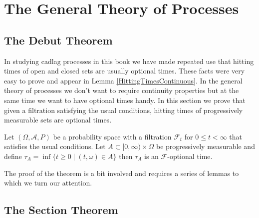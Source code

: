 \chapter{The General Theory of Processes}

\section{The Debut Theorem}

In studying cadlag processes in this book we have made repeated use that hitting times of open and closed sets are usually optional times.  These facts were very easy to prove
and appear in Lemma \ref{HittingTimesContinuous}.   In the general theory of processes we don't want to require continuity properties but at the same time we want to have
optional times handy.  In this section we prove that given a filtration satisfying the usual conditions, hitting times of progressively measurable sets are optional times.  

\begin{thm}\label{DebutTheorem}Let $(\Omega, \mathcal{A}, P)$ be a probability space with a filtration $\mathcal{F}_t$ for $0 \leq t < \infty$ that satisfies the usual conditions.  Let $A \subset [0, \infty) \times \Omega$ be progressively measurable and define $\tau_A = \inf \lbrace t \geq 0 \mid (t, \omega) \in A \rbrace$ then $\tau_A$ is an $\mathcal{F}$-optional time.
\end{thm}

The proof of the theorem is a bit involved and requires a series of lemmas to which we turn our attention.

\section{The Section Theorem}
